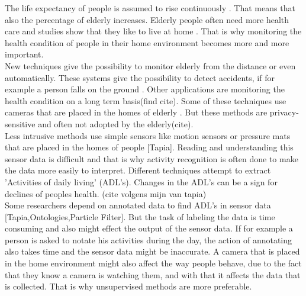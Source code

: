
The life expectancy of people is assumed to rise continuously \cite{4864}. That means that also the percentage of elderly increases. Elderly people often need more health care and studies show that they like to live at home \cite{Cavallo:1315167} . That is why monitoring the health condition of people in their home environment becomes more and more important.\\

New techniques give the possibility to monitor elderly from the distance or even automatically. These systems give the possibility to detect accidents, if for example a person falls on the ground \cite{Mubashir2013144}. Other applications are monitoring the health condition on a long term basis(find cite). Some of these techniques use cameras that are placed in the homes of elderly \cite{Nagai2010204}. But these methods are privacy-sensitive and often not adopted by the elderly(cite).\\
Less intrusive methods use simple sensors like motion sensors or pressure mats that are placed in the homes of people [Tapia]. Reading and understanding this sensor data is difficult and that is why activity recognition is often done to make the data more easily to interpret. Different techniques attempt to extract 'Activities of daily living' (ADL's). Changes in the ADL's can be a sign for declines of peoples health. (cite volgens mijn van tapia)\\
Some researchers depend on annotated data to find ADL's in sensor data [Tapia,Ontologies,Particle Filter]. But the task of labeling the data is time consuming and also might effect the output of the sensor data. If for example a person is asked to notate his activities during the day, the action of annotating also takes time and the sensor data might be inaccurate. A camera that is placed in the home environment might also affect the way people behave, due to the fact that they know a camera is watching them, and with that it affects the data that is collected. That is why unsupervised methods are more preferable.\\


